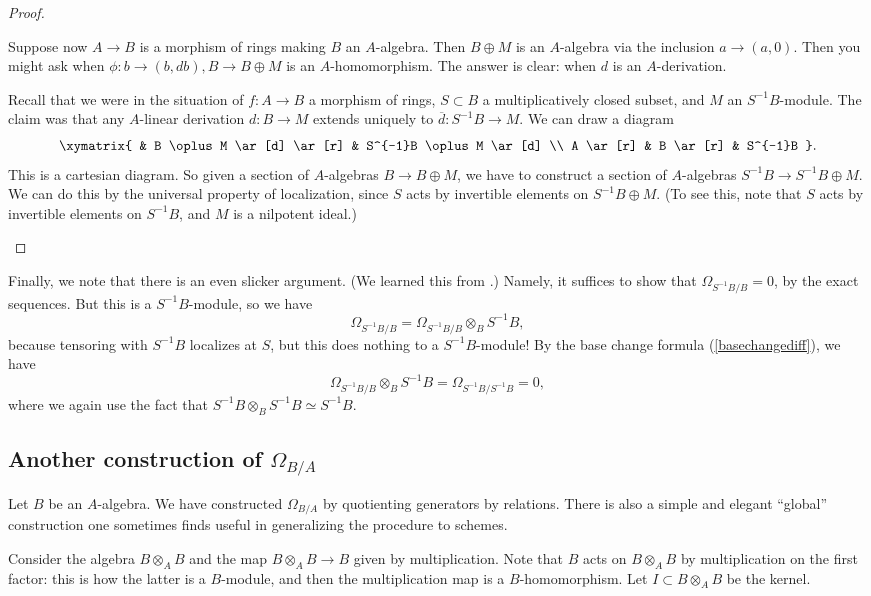 \begin{proof}
\begin{enumerate}
Suppose now $A \to B$ is a morphism of rings making $B$ an $A$-algebra. Then
$B \oplus M$ is an $A$-algebra via the inclusion $a \to (a, 0)$. Then
you might ask when $\phi: b \to (b, db), B \to B \oplus M$ is an
$A$-homomorphism. The answer is clear: when $d$ is an $A$-derivation.

Recall that we were in the situation of $f: A \to B$  a morphism of rings, $S
\subset B$ a multiplicatively closed subset, and $M$ an $S^{-1}B$-module. The
claim was that any $A$-linear derivation $d: B \to M$ extends uniquely to
$\overline{d}: S^{-1} B \to M$.
We can draw a diagram
\[ \xymatrix{
& B \oplus M \ar[d] \ar[r] &  S^{-1}B \oplus M \ar[d] \\
A \ar[r] &  B \ar[r] &  S^{-1}B
}.\]
This is a cartesian diagram. So given a section of $A$-algebras $B \to B \oplus M$, we have to
construct a section of $A$-algebras $S^{-1}B \to S^{-1}B \oplus M$. We can do this by the
universal property of localization, since $S$ acts by invertible elements on
$S^{-1}B \oplus M$. (To see this, note that $S$ acts by invertible elements on
$S^{-1}B$, and $M$ is a nilpotent ideal.)
\end{enumerate}
\end{proof} 

Finally, we note that there is an even slicker argument. (We learned this from
\cite{Qu}.) 
Namely, it suffices to show that $\Omega_{S^{-1}B/B} =0 $, by the exact
sequences.
But this is a $S^{-1}B$-module, so we have
\[  \Omega_{S^{-1}B/B} = \Omega_{S^{-1}B/B} \otimes_B S^{-1}B, \]
because tensoring with $S^{-1}B$ localizes at $S$, but this does nothing to a
$S^{-1}B$-module! By the base change formula (\cref{basechangediff}), we have
\[ \Omega_{S^{-1}B/B} \otimes_B S^{-1}B = \Omega_{S^{-1}B/S^{-1}B} = 0,  \]
where we again use the fact that $S^{-1} B \otimes_B S^{-1} B \simeq S^{-1}B$.

\subsection{Another construction of $\Omega_{B/A}$}

Let $B$ be an $A$-algebra. We have constructed $\Omega_{B/A}$ by quotienting
generators by relations. 
There is also a simple and elegant ``global'' construction one sometimes finds
useful in generalizing the procedure to schemes. 

Consider the algebra $B \otimes_A B$ and the map $B \otimes_A B \to B$ given by
multiplication. 
Note that $B$ acts on $B \otimes_A B$ by multiplication on
the first factor: this is how the latter is a $B$-module, and then the
multiplication map is a $B$-homomorphism. Let $I \subset B \otimes_A B$ be the
kernel. 

